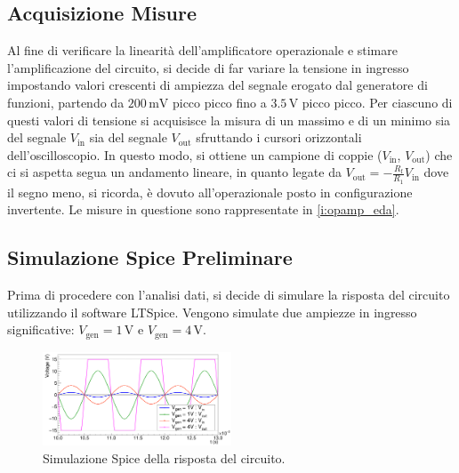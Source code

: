 \documentclass[a4paper,11pt]{article} %
\begin{document}

\subsection{Acquisizione Misure}
Al fine di verificare la linearità dell'amplificatore operazionale e stimare l'amplificazione del circuito, si decide di
far variare la tensione in ingresso impostando valori crescenti di ampiezza del segnale erogato dal generatore di
funzioni, partendo da $200\,\si{\mV}$ picco picco fino a $3.5\,\si{\V}$ picco picco. Per ciascuno di questi valori di
tensione si acquisisce la misura di un massimo e di un minimo sia del segnale $V_{\text{in}}$ sia del segnale
$V_{\text{out}}$ sfruttando i cursori orizzontali dell'oscilloscopio. In questo modo, si ottiene un campione di coppie
($V_{\text{in}}$, $V_{\text{out}}$) che ci si aspetta segua un andamento lineare, in quanto legate da
$V_{\text{out}}=-\frac{R_{\text{f}}}{R_{1}}V_{\text{in}}$ dove il segno meno, si ricorda, è dovuto all'operazionale
posto in configurazione invertente. Le misure in questione sono rappresentate in \autoref{i:opamp_eda}.



\subsection{Simulazione Spice Preliminare}\label{s:spice} Prima di procedere con l'analisi dati, si decide di simulare
la risposta del circuito utilizzando il software LTSpice. Vengono simulate due ampiezze in ingresso significative:
$V_{\text{gen}}=1\,\si{\volt}$ e $V_{\text{gen}}=4\,\si{\volt}$. 

\begin{figure}
	\centering
	\includegraphics[width=0.5\textwidth]{../Plots/Report_Plots/opamp_spice_1V_4V_BIG.png}
	\caption{\footnotesize Simulazione Spice della risposta del circuito.}
	\label{i:opamp_simulation}
\end{figure}
\end{document}
